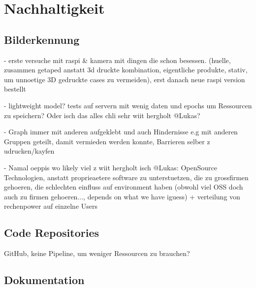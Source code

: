 \section{Nachhaltigkeit}







\subsection{Bilderkennung}

- erste versuche mit raspi \& kamera mit dingen die schon besessen. (huelle, zusammen getaped anstatt 3d druckte kombination, eigentliche produkte, stativ, um unnoetige 3D gedruckte cases zu vermeiden), erst danach neue raspi version bestellt

- lightweight model? tests auf servern mit wenig daten und epochs um Ressourcen zu speichern? Oder isch das alles chli sehr wiit hergholt @Lukas?

- Graph immer mit anderen aufgeklebt und auch Hindernisse e.g mit anderen Gruppen geteilt, damit vermieden werden konnte, Barrieren selber z udrucken/kayfen

- Namal oeppis wo likely viel z wiit hergholt isch @Lukas: OpenSource Technologien, anstatt proprieaetere software zu unterstuetzen, die zu grossfirmen gehoeren, die schlechten einfluss auf environment haben (obwohl viel OSS doch auch zu firmen gehoeren..., depends on what we have iguess)  + verteilung von rechenpower auf einzelne Users 

\subsection{Code Repositories}

GitHub\cite{github-sustainability}, keine Pipeline, um weniger Ressourcen zu brauchen?



\subsection{Dokumentation}

